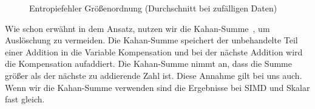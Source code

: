 \begin{figure}[h]
\centering
{}
\caption{Entropiefehler Größenordnung (Durchschnitt bei zufälligen Daten)}
\end{figure}

Wie schon erwähnt in dem Ansatz, nutzen wir die Kahan-Summe~\cite{kahan}, um Auslöschung zu vermeiden. Die Kahan-Summe speichert der unbehandelte Teil  einer Addition in die Variable Kompensation und bei der nächste Addition wird die Kompensation aufaddiert. Die Kahan-Summe nimmt an, dass die Summe größer als der nächste zu addierende Zahl ist. Diese Annahme gilt bei uns auch. Wenn wir die Kahan-Summe verwenden sind die Ergebnisse bei SIMD und Skalar fast gleich.
